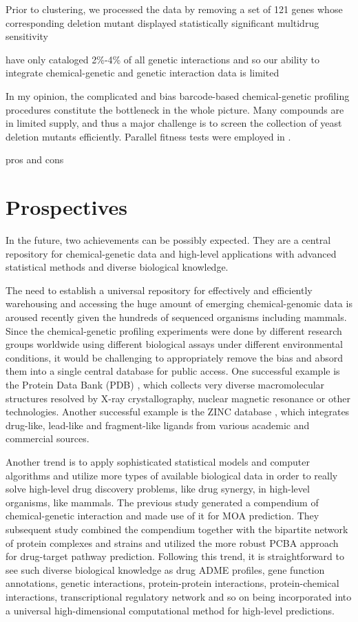 \documentclass[12pt,fullpage,singlespace]{article}
\begin{document}
Prior to clustering, we processed the data by removing a set of 121 genes whose corresponding deletion mutant displayed statistically significant multidrug sensitivity

have only cataloged 2\%-4\% of all genetic interactions and so our ability to integrate chemical-genetic and genetic interaction data is limited

In my opinion, the complicated and bias barcode-based chemical-genetic profiling procedures constitute the bottleneck in the whole picture. Many compounds are in limited supply, and thus a major challenge is to screen the collection of yeast deletion mutants efficiently. Parallel fitness tests were employed in \citep{1078}.

pros and cons

\section{Prospectives}

In the future, two achievements can be possibly expected. They are a central repository for chemical-genetic data and high-level applications with advanced statistical methods and diverse biological knowledge.

The need to establish a universal repository for effectively and efficiently warehousing and accessing the huge amount of emerging chemical-genomic data is aroused recently given the hundreds of sequenced organisms including mammals. Since the chemical-genetic profiling experiments were done by different research groups worldwide using different biological assays under different environmental conditions, it would be challenging to appropriately remove the bias and absord them into a single central database for public access. One successful example is the Protein Data Bank (PDB) \citep{105}, which collects very diverse macromolecular structures resolved by X-ray crystallography, nuclear magnetic resonance or other technologies. Another successful example is the ZINC database \citep{532}, which integrates drug-like, lead-like and fragment-like ligands from various academic and commercial sources.

Another trend is to apply sophisticated statistical models and computer algorithms and utilize more types of available biological data in order to really solve high-level drug discovery problems, like drug synergy, in high-level organisms, like mammals. The previous study \citep{1078}  generated a compendium of chemical-genetic interaction and made use of it for MOA prediction. They subsequent study \citep{1079} combined the compendium together with the bipartite network of protein complexes and strains and utilized the more robust PCBA approach for drug-target pathway prediction. Following this trend, it is straightforward to see such diverse biological knowledge as drug ADME profiles, gene function annotations, genetic interactions, protein-protein interactions, protein-chemical interactions, transcriptional regulatory network and so on being incorporated into a universal high-dimensional computational method for high-level predictions.
\end{document}

